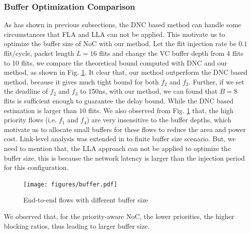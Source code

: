 \documentclass[10pt,journal]{IEEEtran}
\begin{document}
\subsubsection{Buffer Optimization Comparison}
As has shown in previous subsections, the DNC based method \cite{Qian489900} can handle some circumstances that FLA and LLA can not be applied. This motivate us to optimize the buffer size of NoC with our method. Let the flit injection rate be $0.1$ flit/cycle, packet length $L=16$ flits and change the VC buffer depth from 4 flits to 10 flits, we compare the theoretical bound computed with DNC and our method, as shown in Fig. \ref{buffer}. It clear that, our method outperform the DNC based method, because it gives much tight bound for both $f_2$ and $f_3$. Further, if we set the deadline of $f_2$ and $f_3$ to 150ns, with our method, we can found that $B=8$ flits is sufficient enough to guarantee the delay bound. While the DNC based estimation is larger than $10$ flits. We also observed from Fig. \ref{buffer} that, the high priority flows (i.e. $f_1$ and $f_4$) are very insensitive to the buffer depths, which motivate us to allocate small buffers for these flows to reduce the area and power cost. Link-level analysis was extended in \cite{189} to finite buffer size scenario. But, we need to mention that, the LLA approach can not be applied to optimize the buffer size, this is because the network latency is larger than the injection period for this configuration.
\begin{figure}
  \centering
  \texttt{[image: figures/buffer.pdf]}\\
  \caption{End-to-end flows with different buffer size}\label{buffer}
\end{figure}

We observed that, for the priority-aware NoC, the lower priorities, the higher blocking ratios, thus leading to larger buffer size.
\end{document}
